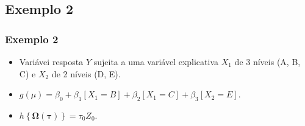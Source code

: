 \documentclass[10pt,
  aspectratio=169,
  serif,
  mathserif,
  professionalfont,
  compress,
  handout,
  ]{beamer}\usepackage[]{graphicx}\usepackage[]{color}
\begin{document}
\subsection{Exemplo 2}

\begin{frame}

\frametitle{Exemplo 2}

\begin{itemize}
    \itemsep 2ex

  \item Variávei resposta $Y$ sujeita a uma variável explicativa $X_1$ de 3 níveis (A, B, C) e $X_2$ de 2 níveis (D, E).

  \item $g(\mu) = \beta_0 + \beta_1[X_1=B] + \beta_2[X_1=C] + \beta_3[X_2=E]$.

  \item $h\left \{ \boldsymbol{\Omega}(\boldsymbol{\tau}) \right \} = \tau_{0}Z_0$.

\end{itemize}

\end{frame}

\end{document}
